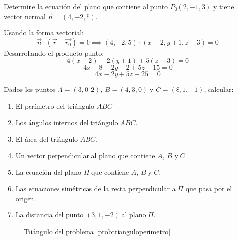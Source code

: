 \begin{example}
Determine la ecuación del plano que contiene al punto \(P_0(2, -1, 3)\) y tiene vector normal \(\vec{n} = (4, -2, 5)\).
\begin{myproof}
 Usando la forma vectorial:
\[
\vec{n} \cdot (\vec{r} - \vec{r_0}) = 0 \implies (4, -2, 5) \cdot (x-2, y+1, z-3) = 0
\]
Desarrollando el producto punto:
\[
4(x-2) - 2(y+1) + 5(z-3) = 0
\]
\[
4x - 8 - 2y - 2 + 5z - 15 = 0
\]
\[
4x - 2y + 5z - 25 = 0
\]
\end{myproof}
\end{example}



\begin{prob} \label{probtrianguloperimetro}
Dados los puntos $A=(3,0,2)$, $B=(4,3,0)$ y $C=(8,1,-1)$, calcular:
\begin{enumerate}[$(a)$]
    \item El perímetro del triángulo $ABC$
    \item Los ángulos internos del triángulo $ABC.$
    \item El área del triángulo $ABC.$
        \item Un vector perpendicular al plano que contiene $A$, $B$ y $C$
    \item La ecuación del plano $\Pi$ que contiene $A$, $B$ y $C$.
    \item Las ecuaciones simétricas de la recta perpendicular a $\Pi$ que pasa por el origen.
    \item La distancia del punto $(3,1,-2)$ al plano $\Pi.$
\end{enumerate}

\begin{myproof}
\begin{multicols}{2}
\begin{figure}[H]
\centering
{}
\caption{Triángulo del problema \ref{probtrianguloperimetro}}
\end{figure}


\end{multicols}
\end{myproof}
\end{prob}
